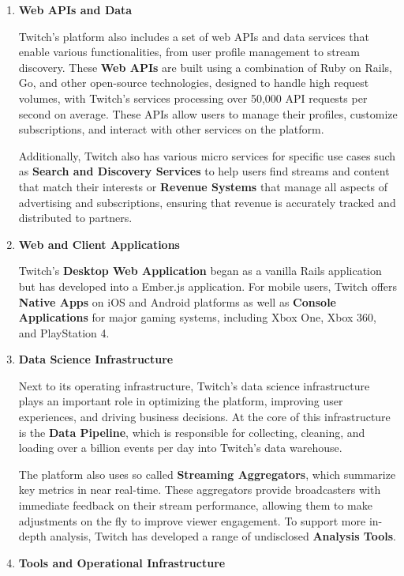 \begin{enumerate}
    \item \textbf{Web \ac{API}s and Data}

    Twitch’s platform also includes a set of web \ac{API}s and data services that enable various functionalities, from user profile management to stream discovery. These \textbf{Web \ac{API}s} are built using a combination of Ruby on Rails, Go, and other open-source technologies, designed to handle high request volumes, with Twitch's services processing over 50,000 \ac{API} requests per second on average. These \ac{API}s allow users to manage their profiles, customize subscriptions, and interact with other services on the platform.

    Additionally, Twitch also has various micro services for specific use cases such as \textbf{Search and Discovery Services} to help users find streams and content that match their interests or \textbf{Revenue Systems} that manage all aspects of advertising and subscriptions, ensuring that revenue is accurately tracked and distributed to partners. 
    
    \item \textbf{Web and Client Applications}
    
    Twitch’s \textbf{Desktop Web Application} began as a vanilla Rails application but has developed into a Ember.js application. For mobile users, Twitch offers \textbf{Native Apps} on iOS and Android platforms as well as \textbf{Console Applications} for major gaming systems, including Xbox One, Xbox 360, and PlayStation 4.

    \item \textbf{Data Science Infrastructure}

    Next to its operating infrastructure, Twitch’s data science infrastructure plays an important role in optimizing the platform, improving user experiences, and driving business decisions. At the core of this infrastructure is the \textbf{Data Pipeline}, which is responsible for collecting, cleaning, and loading over a billion events per day into Twitch’s data warehouse. 

    The platform also uses so called \textbf{Streaming Aggregators}, which summarize key metrics in near real-time. These aggregators provide broadcasters with immediate feedback on their stream performance, allowing them to make adjustments on the fly to improve viewer engagement. To support more in-depth analysis, Twitch has developed a range of undisclosed \textbf{Analysis Tools}.

    \item \textbf{Tools and Operational Infrastructure}


\end{enumerate}
